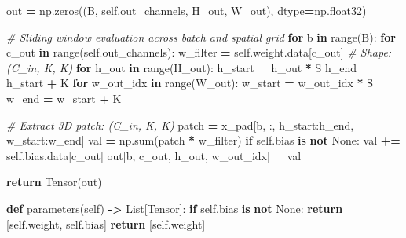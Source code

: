 \documentclass[
  letterpaper,
]{scrbook}
\newenvironment{Shaded}{\begin{snugshade}}{\end{snugshade}}
\newcommand{\BuiltInTok}[1]{#1}
\newcommand{\CommentTok}[1]{\textcolor[rgb]{0.56,0.35,0.01}{\textit{#1}}}
\newcommand{\ControlFlowTok}[1]{\textcolor[rgb]{0.13,0.29,0.53}{\textbf{#1}}}
\newcommand{\KeywordTok}[1]{\textcolor[rgb]{0.13,0.29,0.53}{\textbf{#1}}}
\newcommand{\NormalTok}[1]{#1}
\newcommand{\OperatorTok}[1]{\textcolor[rgb]{0.81,0.36,0.00}{\textbf{#1}}}
\newcommand{\VariableTok}[1]{\textcolor[rgb]{0.00,0.00,0.00}{#1}}
\begin{document}
\begin{Shaded}
\begin{Highlighting}[]
\NormalTok{        out }\OperatorTok{=}\NormalTok{ np.zeros((B, }\VariableTok{self}\NormalTok{.out\_channels, H\_out, W\_out), dtype}\OperatorTok{=}\NormalTok{np.float32)}

        \CommentTok{\# Sliding window evaluation across batch and spatial grid}
        \ControlFlowTok{for}\NormalTok{ b }\KeywordTok{in} \BuiltInTok{range}\NormalTok{(B):}
            \ControlFlowTok{for}\NormalTok{ c\_out }\KeywordTok{in} \BuiltInTok{range}\NormalTok{(}\VariableTok{self}\NormalTok{.out\_channels):}
\NormalTok{                w\_filter }\OperatorTok{=} \VariableTok{self}\NormalTok{.weight.data[c\_out]  }\CommentTok{\# Shape: (C\_in, K, K)}
                \ControlFlowTok{for}\NormalTok{ h\_out }\KeywordTok{in} \BuiltInTok{range}\NormalTok{(H\_out):}
\NormalTok{                    h\_start }\OperatorTok{=}\NormalTok{ h\_out }\OperatorTok{*}\NormalTok{ S}
\NormalTok{                    h\_end }\OperatorTok{=}\NormalTok{ h\_start }\OperatorTok{+}\NormalTok{ K}
                    \ControlFlowTok{for}\NormalTok{ w\_out\_idx }\KeywordTok{in} \BuiltInTok{range}\NormalTok{(W\_out):}
\NormalTok{                        w\_start }\OperatorTok{=}\NormalTok{ w\_out\_idx }\OperatorTok{*}\NormalTok{ S}
\NormalTok{                        w\_end }\OperatorTok{=}\NormalTok{ w\_start }\OperatorTok{+}\NormalTok{ K}

                        \CommentTok{\# Extract 3D patch: (C\_in, K, K)}
\NormalTok{                        patch }\OperatorTok{=}\NormalTok{ x\_pad[b, :, h\_start:h\_end, w\_start:w\_end]}
\NormalTok{                        val }\OperatorTok{=}\NormalTok{ np.}\BuiltInTok{sum}\NormalTok{(patch }\OperatorTok{*}\NormalTok{ w\_filter)}
                        \ControlFlowTok{if} \VariableTok{self}\NormalTok{.bias }\KeywordTok{is} \KeywordTok{not} \VariableTok{None}\NormalTok{:}
\NormalTok{                            val }\OperatorTok{+=} \VariableTok{self}\NormalTok{.bias.data[c\_out]}
\NormalTok{                        out[b, c\_out, h\_out, w\_out\_idx] }\OperatorTok{=}\NormalTok{ val}

        \ControlFlowTok{return}\NormalTok{ Tensor(out)}

    \KeywordTok{def}\NormalTok{ parameters(}\VariableTok{self}\NormalTok{) }\OperatorTok{{-}\textgreater{}}\NormalTok{ List[Tensor]:}
        \ControlFlowTok{if} \VariableTok{self}\NormalTok{.bias }\KeywordTok{is} \KeywordTok{not} \VariableTok{None}\NormalTok{:}
            \ControlFlowTok{return}\NormalTok{ [}\VariableTok{self}\NormalTok{.weight, }\VariableTok{self}\NormalTok{.bias]}
        \ControlFlowTok{return}\NormalTok{ [}\VariableTok{self}\NormalTok{.weight]}
\end{Highlighting}
\end{Shaded}
\end{document}
